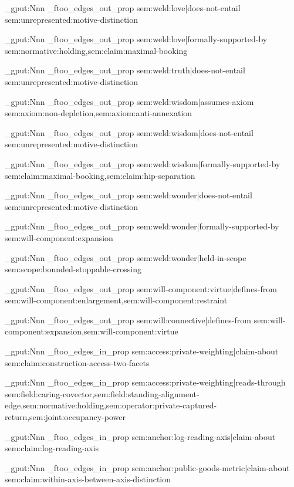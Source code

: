\prop_gput:Nnn \g_ftoo_edges_out_prop { sem:weld:love|does-not-entail } { sem:unrepresented:motive-distinction }

\prop_gput:Nnn \g_ftoo_edges_out_prop { sem:weld:love|formally-supported-by } { sem:normative:holding,sem:claim:maximal-booking }

\prop_gput:Nnn \g_ftoo_edges_out_prop { sem:weld:truth|does-not-entail } { sem:unrepresented:motive-distinction }

\prop_gput:Nnn \g_ftoo_edges_out_prop { sem:weld:wisdom|assumes-axiom } { sem:axiom:non-depletion,sem:axiom:anti-annexation }

\prop_gput:Nnn \g_ftoo_edges_out_prop { sem:weld:wisdom|does-not-entail } { sem:unrepresented:motive-distinction }

\prop_gput:Nnn \g_ftoo_edges_out_prop { sem:weld:wisdom|formally-supported-by } { sem:claim:maximal-booking,sem:claim:hip-separation }

\prop_gput:Nnn \g_ftoo_edges_out_prop { sem:weld:wonder|does-not-entail } { sem:unrepresented:motive-distinction }

\prop_gput:Nnn \g_ftoo_edges_out_prop { sem:weld:wonder|formally-supported-by } { sem:will-component:expansion }

\prop_gput:Nnn \g_ftoo_edges_out_prop { sem:weld:wonder|held-in-scope } { sem:scope:bounded-stoppable-crossing }

\prop_gput:Nnn \g_ftoo_edges_out_prop { sem:will-component:virtue|defines-from } { sem:will-component:enlargement,sem:will-component:restraint }

\prop_gput:Nnn \g_ftoo_edges_out_prop { sem:will:connective|defines-from } { sem:will-component:expansion,sem:will-component:virtue }



\prop_gput:Nnn \g_ftoo_edges_in_prop { sem:access:private-weighting|claim-about } { sem:claim:construction-access-two-facets }

\prop_gput:Nnn \g_ftoo_edges_in_prop { sem:access:private-weighting|reads-through } { sem:field:caring-covector,sem:field:standing-alignment-edge,sem:normative:holding,sem:operator:private-captured-return,sem:joint:occupancy-power }

\prop_gput:Nnn \g_ftoo_edges_in_prop { sem:anchor:log-reading-axis|claim-about } { sem:claim:log-reading-axis }

\prop_gput:Nnn \g_ftoo_edges_in_prop { sem:anchor:public-goods-metric|claim-about } { sem:claim:within-axis-between-axis-distinction }

